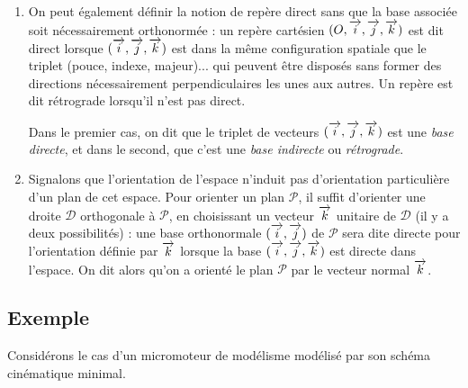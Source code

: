 \documentclass[10pt,oneside]{article}
\begin{document}

\begin{rem}

\begin{enumerate}
\item On peut également définir la notion de repère direct sans que la base associée soit nécessairement orthonormée : un repère cartésien $(O, \overrightarrow{i}, \overrightarrow{j}, \overrightarrow{k})$ est dit direct lorsque $(\overrightarrow{i}, \overrightarrow{j}, \overrightarrow{k})$ est dans la même configuration spatiale que le triplet (pouce, indexe, majeur)... qui peuvent être disposés sans former des directions nécessairement perpendiculaires les unes aux autres. Un repère est dit rétrograde lorsqu'il n'est pas direct.

Dans le premier cas, on dit que le triplet de vecteurs $(\overrightarrow{i}, \overrightarrow{j}, \overrightarrow{k})$ est une \emph{base directe}, et dans le second, que c'est une \emph{base indirecte} ou \emph{rétrograde}.
\item Signalons que l'orientation de l'espace n'induit pas d'orientation particulière d'un plan de cet espace. Pour orienter un plan $\mathscr P$, il suffit d'orienter une droite $\mathscr D$ orthogonale à $\mathscr P$, en choisissant un vecteur $\overrightarrow{k}$ unitaire de $\mathscr D$ (il y a deux possibilités) : une base orthonormale $(\overrightarrow{i}, \overrightarrow{j})$ de $\mathscr P$ sera dite directe pour l'orientation définie par $\overrightarrow{k}$ lorsque la base $(\overrightarrow{i}, \overrightarrow{j}, \overrightarrow{k})$ est directe dans l'espace. On dit alors qu'on a orienté le plan $\mathscr P$ par le vecteur normal $\overrightarrow{k}$.\\
\end{enumerate}

\end{rem}

\subsection{Exemple}

Considérons le cas d'un micromoteur de modélisme modélisé par son schéma cinématique minimal.
\end{document}
